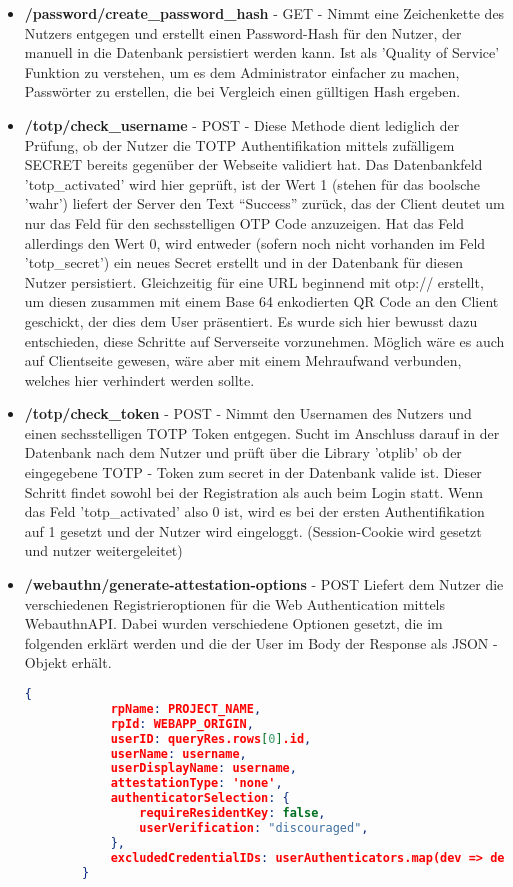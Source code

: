 \begin{enumerate}
\begin{itemize}
 \item \textbf{/password/create\_password\_hash} - GET - Nimmt eine Zeichenkette des Nutzers entgegen und erstellt einen Password-Hash für den Nutzer, der manuell in die Datenbank persistiert werden kann. Ist als 'Quality of Service' Funktion zu verstehen, um es dem Administrator einfacher zu machen, Passwörter zu erstellen, die bei Vergleich einen gülltigen Hash ergeben.
 
 \item \textbf{/totp/check\_username} - POST - Diese Methode dient lediglich der Prüfung, ob der Nutzer die TOTP Authentifikation mittels zufälligem SECRET bereits gegenüber der Webseite validiert hat. Das Datenbankfeld 'totp\_activated' wird hier geprüft, ist der Wert 1 (stehen für das boolsche 'wahr') liefert der Server den Text ``Success'' zurück, das der Client deutet um nur das Feld für den sechsstelligen OTP Code anzuzeigen. Hat das Feld allerdings den Wert 0, wird entweder (sofern noch nicht vorhanden im Feld 'totp\_secret') ein neues Secret erstellt und in der Datenbank für diesen Nutzer persistiert. Gleichzeitig für eine URL beginnend mit otp:// erstellt, um diesen zusammen mit einem Base 64 enkodierten QR Code an den Client geschickt, der dies dem User präsentiert. Es wurde sich hier bewusst dazu entschieden, diese Schritte auf Serverseite vorzunehmen. Möglich wäre es auch auf Clientseite gewesen, wäre aber mit einem Mehraufwand verbunden, welches hier verhindert werden sollte.
 
 \item \textbf{/totp/check\_token} - POST - Nimmt den Usernamen des Nutzers und einen sechsstelligen TOTP Token entgegen. Sucht im Anschluss darauf in der Datenbank nach dem Nutzer und prüft über die Library 'otplib' ob der eingegebene TOTP - Token zum secret in der Datenbank valide ist. Dieser Schritt findet sowohl bei der Registration als auch beim Login statt. Wenn das Feld 'totp\_activated' also 0 ist, wird es bei der ersten Authentifikation auf 1 gesetzt und der Nutzer wird eingeloggt. (Session-Cookie wird gesetzt und nutzer weitergeleitet)
 \newpage

 \item \textbf{/webauthn/generate-attestation-options} - POST
 Liefert dem Nutzer die verschiedenen Registrieroptionen für die Web Authentication mittels WebauthnAPI. Dabei wurden verschiedene Optionen gesetzt, die im folgenden erklärt werden und die der User im Body der Response als JSON - Objekt erhält.
 
 \begin{lstlisting}[language=json,firstnumber=1]
        {
            rpName: PROJECT_NAME,
            rpId: WEBAPP_ORIGIN,
            userID: queryRes.rows[0].id,
            userName: username,
            userDisplayName: username,
            attestationType: 'none',
            authenticatorSelection: {
                requireResidentKey: false,
                userVerification: "discouraged",
            },
            excludedCredentialIDs: userAuthenticators.map(dev => dev.credentialID),
        }
\end{lstlisting}


\end{itemize}
\end{enumerate}
